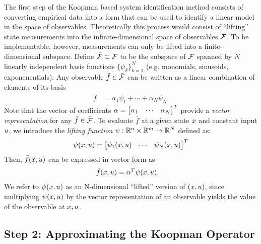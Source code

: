 The first step of the Koopman based system identification method consists of converting empirical data into a form that can be used to identify a linear model in the space of observables.
Theoretically this process would consist of ``lifting'' state measurements into the infinite-dimensional space of observables $\mathcal{F}$.
To be implementable, however, measurements can only be lifted into a finite-dimensional subspace.
Define $\bar{\mathcal{F}} \subset \mathcal{F}$ to be the subspace of $\mathcal{F}$ spanned by $N$ linearly independent basis functions $\{ \psi_k \}_{k=1}^N$ 
(e.g. monomials, sinusoids, exponenentials).
%
Any observable ${\bar{f} \in \bar{\mathcal{F}}}$ can be written as a linear combination of elements of its basis
\begin{align}
    \bar{f} &= \alpha_1 \psi_{1} + \cdots + \alpha_N \psi_N.
\end{align}
Note that the vector of coefficients ${\alpha = \begin{bmatrix} \alpha_1 & \cdots & \alpha_N \end{bmatrix}^T}$ provide a \emph{vector representation} for any $\bar{f} \in \bar{\mathcal{F}}$.
To evaluate $\bar{f}$ at a given state $x$ and constant input $u$, we introduce the \emph{lifting function} ${\psi}:\mathbb{R}^n \times \mathbb{R}^m \to \mathbb{R}^N$ defined as:
\begin{align}
    {\psi}(x, u) = \begin{bmatrix}  \psi_1(x, u) & \cdots & \psi_N(x, u) \end{bmatrix}^T
    \label{eq:lift}
\end{align}
Then, $\bar{f}(x, u)$ can be expressed in vector form as
\begin{align}
    \bar{f}(x, u) &= {\alpha}^T {\psi}(x, u).
    \label{eq:fxu}
\end{align}
We refer to ${\psi}(x, u)$ as an N-dimensional ``lifted'' version of ${(x, u)}$, since multiplying ${\psi}(x, u)$ by the vector representation of an observable yields the value of the observable at $x, u$.



\subsection{Step 2: Approximating the Koopman Operator} \label{sec:step2}

